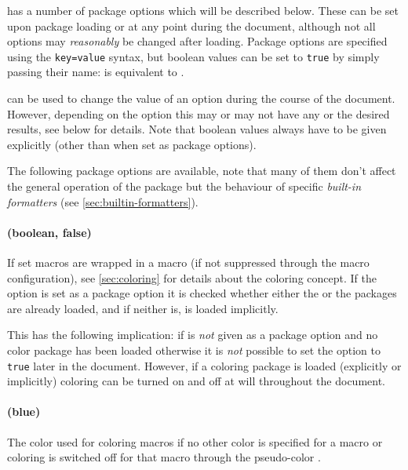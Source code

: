 \documentclass{scrartcl}
\begin{document}
 has a number of package options which will be described
below.  These can be set upon package loading or at any point during the
document, although not all options may \emph{reasonably} be changed after
loading.  Package options are specified using the \texttt{key=value} syntax, but
boolean values can be set to \texttt{true} by simply passing their name:
\luavar{[color]} is equivalent to \luavar{[color=true]}.

 can be used to change the value of
an option during the course of the document.  However, depending on the option
this may or may not have any or the desired results, see below for details.
Note that boolean values always have to be given explicitly (other than when set
as package options).

The following package options are available, note that many of them don't affect
the general operation of the package but the behaviour of specific
\emph{built-in formatters} (see \vref{sec:builtin-formatters}).


\paragraph{ (boolean, false)}

If set macros are wrapped in a  macro (if not suppressed through
the macro configuration),  see \vref{sec:coloring} for details about the
coloring concept.  If the option is set as a package option it is checked
whether either the  or the  packages are already
loaded, and if neither is,  is loaded implicitly.

This has the following implication: if  is \emph{not} given as a
package option and no color package has been loaded otherwise it is \emph{not}
possible to set the option to \texttt{true} later in the document.  However, if
a coloring package is loaded (explicitly or implicitly) coloring can be turned
on and off at will throughout the document.

\paragraph{ (blue)}

The color used for coloring macros if no other color is specified for a macro or
coloring is switched off for that macro through the pseudo-color
.
\end{document}
